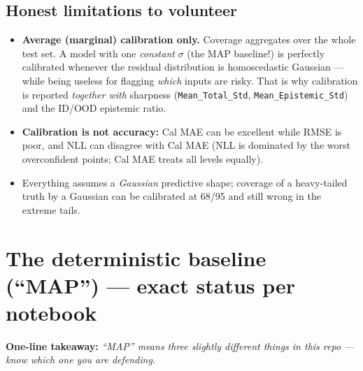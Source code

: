 \documentclass[10pt,a4paper]{article}
\newcommand{\code}[1]{\texttt{#1}}
\newcommand{\takeaway}[1]{\textbf{One-line takeaway:} \emph{#1}}
\begin{document}
\subsection{Honest limitations to volunteer}
\begin{itemize}
\item \textbf{Average (marginal) calibration only.} Coverage aggregates over the whole test set.
  A model with one \emph{constant} $\sigma$ (the MAP baseline!) is perfectly calibrated whenever
  the residual distribution is homoscedastic Gaussian --- while being useless for flagging
  \emph{which} inputs are risky. That is why calibration is reported \emph{together with}
  sharpness (\code{Mean\_Total\_Std}, \code{Mean\_Epistemic\_Std}) and the ID/OOD epistemic ratio.
\item \textbf{Calibration is not accuracy:} Cal MAE can be excellent while RMSE is poor, and NLL can
  disagree with Cal MAE (NLL is dominated by the worst overconfident points; Cal MAE treats all
  levels equally).
\item Everything assumes a \emph{Gaussian} predictive shape; coverage of a heavy-tailed truth by a
  Gaussian can be calibrated at 68/95 and still wrong in the extreme tails.
\end{itemize}

\section{The deterministic baseline (``MAP'') --- exact status per notebook}\label{sec:map}
\takeaway{``MAP'' means three slightly different things in this repo --- know which one you are
defending.}
\end{document}
